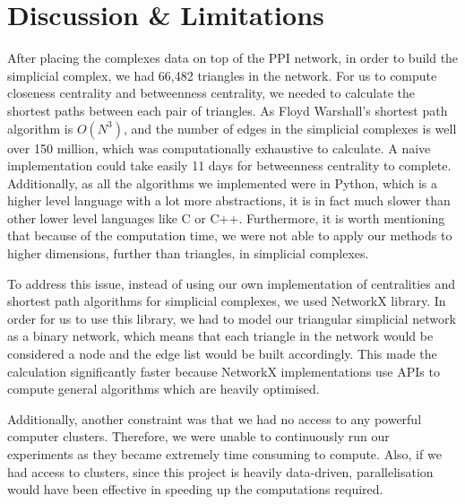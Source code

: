 \documentclass[9pt]{article}
\begin{document}
\section{Discussion \& Limitations} 
After placing the complexes data on top of the PPI network, in order to build the simplicial complex, we had 66,482 triangles in the network. For us to compute closeness centrality and betweenness centrality, we needed to calculate the shortest paths between each pair of triangles. As Floyd Warshall’s shortest path algorithm is \(O(N^3)\), and the number of edges in the simplicial complexes is well over 150 million, which was computationally exhaustive to calculate. A naive implementation could take easily 11 days for betweenness centrality to complete. Additionally, as all the algorithms we implemented were in Python, which is a higher level language with a lot more abstractions, it is in fact much slower than other lower level languages like C or C++. Furthermore, it is worth mentioning that because of the computation time, we were not able to apply our methods to higher dimensions, further than triangles, in simplicial complexes.
\par
To address this issue, instead of using our own implementation of centralities and shortest path algorithms for simplicial complexes, we used NetworkX library. In order for us to use this library, we had to model our triangular simplicial network as a binary network, which means that each triangle in the network would be considered a node and the edge list would be built accordingly. This made the calculation significantly faster because NetworkX implementations use APIs to compute general algorithms which are heavily optimised.
\par
Additionally, another constraint was that we had no access to any powerful computer clusters. Therefore, we were unable to continuously run our experiments as they became extremely time consuming to compute. Also, if we had access to clusters, since this project is heavily data-driven, parallelisation would have been effective in speeding up the computations required.  
\end{document}
